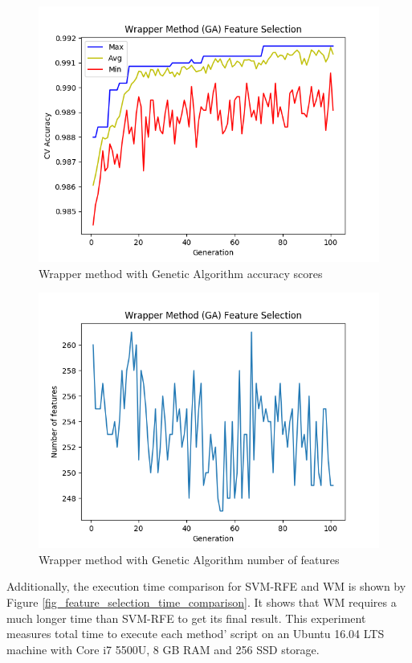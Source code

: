 \documentclass[conference,compsoc,12pt]{IEEEtran}
\begin{document}
	\begin{figure}
		\includegraphics[scale=0.5]{../images/WM_GA_SVM_acc_chart.png}
		\caption{Wrapper method with Genetic Algorithm accuracy scores}
		\label{fig_wm_acc_chart}
	\end{figure}
	
	\begin{figure}
		\includegraphics[scale=0.5]{../images/WM_GA_SVM_feat_chart.png}
		\caption{Wrapper method with Genetic Algorithm number of features}
		\label{fig_wm_num_features_chart}
	\end{figure}
	
	Additionally, the execution time comparison for SVM-RFE and WM is shown by Figure \ref{fig_feature_selection_time_comparison}. It shows that WM requires a much longer time than SVM-RFE to get its final result. This experiment measures total time to execute each method' script on an Ubuntu 16.04 LTS machine with Core i7 5500U, 8 GB RAM and 256 SSD storage.
		
\end{document}

